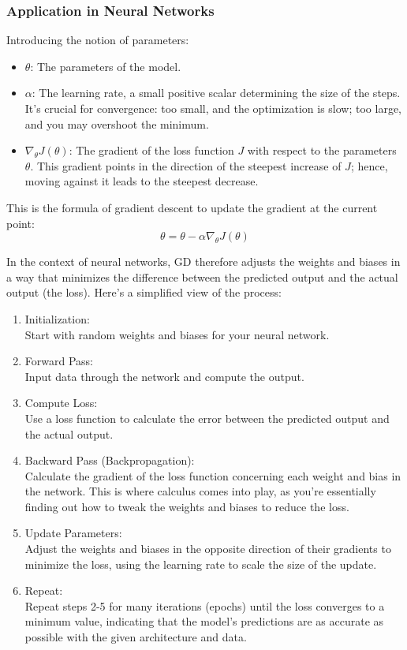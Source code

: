 \documentclass[oneside]{article}
\begin{document}
\subsubsection{Application in Neural Networks}
Introducing the notion of parameters:
\begin{itemize}
    \item \( \theta \): The parameters of the model.
    \item \( \alpha \): The learning rate, a small positive scalar determining the size of the steps. It's crucial for convergence: too small, and the optimization is slow; too large, and you may overshoot the minimum.
    \item \( \nabla_\theta J(\theta) \): The gradient of the loss function \( J \) with respect to the parameters \( \theta \). This gradient points in the direction of the steepest increase of \( J \); hence, moving against it leads to the steepest decrease.
\end{itemize}
This is the formula of gradient descent to update the gradient at the current point:
\[ \theta = \theta - \alpha \nabla_\theta J(\theta) \]

In the context of neural networks, GD therefore adjusts the weights and biases in a way that minimizes the difference between the predicted output and the actual output (the loss). Here's a simplified view of the process:
\begin{enumerate}
    \item  Initialization:\\
    Start with random weights and biases for your neural network.
    \item  Forward Pass: \\
    Input data through the network and compute the output.
    \item  Compute Loss: \\
    Use a loss function to calculate the error between the predicted output and the actual output.
    \item  Backward Pass (Backpropagation):\\
    Calculate the gradient of the loss function concerning each weight and bias in the network. This is where calculus comes into play, as you're essentially finding out how to tweak the weights and biases to reduce the loss.
    \item  Update Parameters:\\
    Adjust the weights and biases in the opposite direction of their gradients to minimize the loss, using the learning rate to scale the size of the update.
    \item  Repeat: \\
    Repeat steps 2-5 for many iterations (epochs) until the loss converges to a minimum value, indicating that the model's predictions are as accurate as possible with the given architecture and data.
\end{enumerate}
\end{document}
